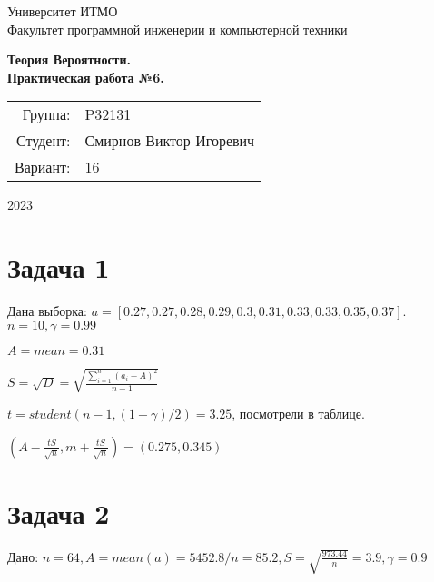 \documentclass{article}
\begin{document}
\begin{titlepage}
    \begin{center}
        \begin{spacing}{1.4}
            \large{Университет ИТМО} \\
            \large{Факультет программной инженерии и компьютерной техники} \\
        \end{spacing}
        \vfill
        \textbf{
            \huge{Теория Вероятности.} \\
            \huge{Практическая работа №6.} \\
        }
    \end{center}
    \vfill
    \begin{center}
        \begin{tabular}{r l}
            Группа:  & P32131                  \\
            Студент: & Смирнов Виктор Игоревич \\
            Вариант: & 16                      \\
        \end{tabular}
    \end{center}
    \vfill
    \begin{center}
        \begin{large}
            2023
        \end{large}
    \end{center}
\end{titlepage}

\section{Задача 1}

Дана выборка: $a = [0.27, 0.27, 0.28, 0.29, 0.3, 0.31, 0.33, 0.33, 0.35, 0.37]$.
$n = 10, \gamma = 0.99$

$A = mean = 0.31$

$S = \sqrt{D} = \sqrt{\frac{\sum_{i=1}^n(a_i - A)^2}{n - 1}}$

$t = student(n - 1, (1 + \gamma) / 2) = 3.25$, посмотрели в таблице.

$(A - \frac{tS}{\sqrt{n}}, m + \frac{tS}{\sqrt{n}}) = (0.275, 0.345)$

\section{Задача 2}

Дано: $
n = 64, 
A = mean(a) = 5452.8 / n = 85.2, 
S = \sqrt{\frac{973.44}{n}} = 3.9,
\gamma = 0.9
$
\end{document}
